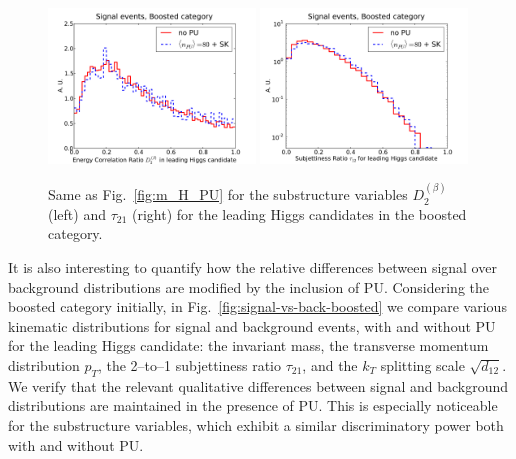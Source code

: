 \begin{figure}[t]
  \begin{center}
  \includegraphics[width=0.49\textwidth]{plots/D2_h0_bst_comp.pdf}
  \includegraphics[width=0.49\textwidth]{plots/tau21_h0_bst_comp.pdf}
  \caption{\small
    Same as Fig.~\ref{fig:m_H_PU} for the
    substructure variables $D_2^{(\beta)}$ (left)
     and $\tau_{21}$ (right)
     for the leading Higgs candidates in the boosted category.
}
\label{fig:Substructure_PU}
\end{center}
\end{figure}

It is also interesting to quantify how
the relative differences between
signal over background distributions are modified by the inclusion of PU.
%
Considering the boosted category initially,
in Fig.~\ref{fig:signal-vs-back-boosted} we compare
various kinematic distributions for signal and background events,
with and without PU for the leading Higgs candidate: the invariant mass, the transverse
momentum distribution $p_T$,
     the 2--to--1 subjettiness ratio $\tau_{21}$, and 
     the $k_T$ splitting scale $\sqrt{d_{12}}$.
      We verify that the relevant
      qualitative differences between signal
      and background distributions are maintained  in the presence of PU.
      This is especially noticeable for the substructure variables, which
      exhibit a similar discriminatory power both with and without
      PU.
     


